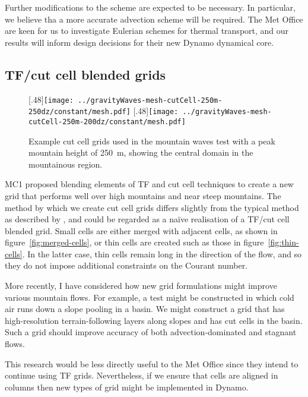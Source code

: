 \documentclass[a4paper]{article}
\begin{document}
Further modifications to the scheme are expected to be necessary.  In particular, we believe tha a more accurate advection scheme will be required.  The Met Office are keen for us to investigate Eulerian schemes for thermal transport, and our results will inform design decisions for their new Dynamo dynamical core.  

\subsection*{TF/cut cell blended grids}
\begin{figure}
	\centering
	[.48\linewidth]{\texttt{[image: ../gravityWaves-mesh-cutCell-250m-250dz/constant/mesh.pdf]}}
	[.48\linewidth]{\texttt{[image: ../gravityWaves-mesh-cutCell-250m-200dz/constant/mesh.pdf]}}
%
	\caption{Example cut cell grids used in the mountain waves test with a peak mountain height of \SI{250}{\meter}, showing the central domain in the mountainous region.}
	\label{fig:cutCell-grids}
\end{figure}
MC1 proposed blending elements of TF and cut cell techniques to create a new grid that performs well over high mountains and near steep mountains.
The method by which we create cut cell grids differs slightly from the typical method as described by \citet{adcroft1997}, and could be regarded as a na\"{i}ve realisation of a TF/cut cell blended grid.  Small cells are either merged with adjacent cells, as shown in figure~\ref{fig:merged-cells}, or thin cells are created such as those in figure~\ref{fig:thin-cells}.  In the latter case, thin cells remain long in the direction of the flow, and so they do not impose additional constraints on the Courant number.  

More recently, I have considered how new grid formulations might improve various mountain flows.  For example, a test might be constructed in which cold air runs down a slope pooling in a basin.  We might construct a grid that has high-resolution terrain-following layers along slopes and has cut cells in the basin.  Such a grid should improve accuracy of both advection-dominated and stagnant flows.

This research would be less directly useful to the Met Office since they intend to continue using TF grids.  Nevertheless, if we ensure that cells are aligned in columns then new types of grid might be implemented in Dynamo.
\end{document}
